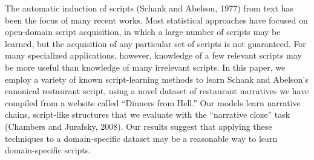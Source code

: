 The automatic induction of scripts (Schank and Abelson, 1977) from text has been the focus of many recent works. Most statistical approaches have focused on open-domain script acquisition, in which a large number of scripts may be learned, but the acquisition of any particular set of scripts is not guaranteed. For many specialized applications, however, knowledge of a few relevant scripts may be more useful than knowledge of many irrelevant scripts. In this paper, we employ a variety of known script-learning methods to learn Schank and Abelson's canonical restaurant script, using a novel dataset of restaurant narratives we have compiled from a website called ``Dinners from Hell.'' Our models learn narrative chains, script-like structures that we evaluate with the ``narrative cloze'' task (Chambers and Jurafsky, 2008). Our results suggest that applying these techniques to a domain-specific dataset may be a reasonable way to learn domain-specific scripts.
